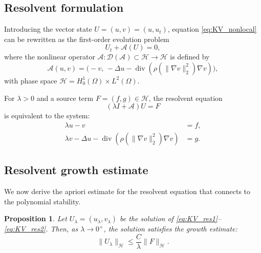 \documentclass[11pt,reqno]{amsart}
\newtheorem{proposition}[theorem]{Proposition}
\theoremstyle{remark}
\begin{document}
\subsection{Resolvent formulation}
\label{subsec:KV_nonlocal_resolvent}

Introducing the vector state $U=(u,v)=(u,u_t)$, equation \eqref{eq:KV_nonlocal} can be rewritten as
the first-order evolution problem
\begin{equation}\label{eq:KV_nonlocal_abstract}
U_t+\mathcal A(U)=0,
\end{equation}
where the nonlinear operator $\mathcal A:\mathcal D(\mathcal A)\subset\mathcal H\to\mathcal H$
is defined by
\[
\mathcal A(u,v)=\big(-v,\,-\Delta u-
\operatorname{div}(\rho(\|\nabla v\|_2^2)\nabla v)\big),
\]
with phase space $\mathcal H=H_0^1(\Omega)\times L^2(\Omega)$.

For $\lambda>0$ and a source term $F=(f,g)\in\mathcal H$, the resolvent equation
\[
(\lambda I+\mathcal A)U=F
\]
is equivalent to the system:
\begin{align}
\lambda u-v&=f, \label{eq:KV_res1}\\
\lambda v-\Delta u-
\operatorname{div}(\rho(\|\nabla v\|_2^2)\nabla v)&=g. \label{eq:KV_res2}
\end{align}

\subsection{Resolvent growth estimate}
\label{subsec:KV_nonlocal_growth}

We now derive the apriori estimate for the resolvent equation that connects to the polynomial stability.

\begin{proposition}\label{prop:KV_nonlocal_growth}
Let $U_\lambda=(u_\lambda,v_\lambda)$ be the solution of
\eqref{eq:KV_res1}--\eqref{eq:KV_res2}.
Then, as $\lambda\to 0^+$, the solution satisfies the growth estimate:
\[
\|U_\lambda\|_{\mathcal H}\le \frac{C}{\lambda}\|F\|_{\mathcal H}.
\]
\end{proposition}
\end{document}

